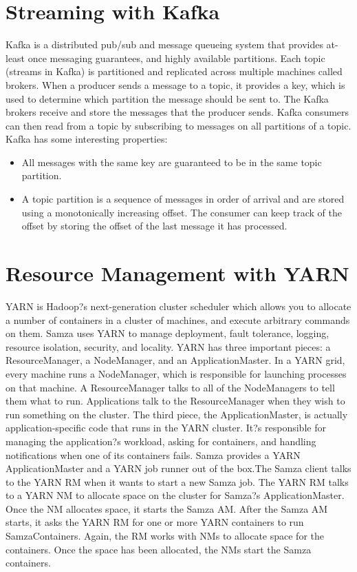 \documentclass[9pt,twocolumn,twoside]{styles/osajnl}
\begin{document}
\section{Streaming with Kafka}
Kafka is a distributed pub/sub and message queueing system that provides
at-least once messaging guarantees, and highly available partitions. Each topic
(streams in Kafka) is partitioned and replicated across multiple machines called
brokers. When a producer sends a message to a topic, it provides a key, which is
used to determine which partition the message should be sent to. The Kafka
brokers receive and store the messages that the producer sends. Kafka consumers
can then read from a topic by subscribing to messages on all partitions of a
topic.\cite{paper2}
Kafka has some interesting properties:

\begin{itemize}
\renewcommand{\labelitemi}{\scriptsize$\square$} 
\item All messages with the same key are guaranteed to be in the same topic partition.
\item A topic partition is a sequence of messages in order of arrival and are stored
using a monotonically increasing offset. The consumer can keep track of the
offset by storing the offset of the last message it has processed. 
\end{itemize}

\section{Resource Management with YARN}
YARN is Hadoop?s next-generation cluster scheduler which allows you to allocate
a number of containers in a cluster of machines, and execute arbitrary commands
on them. Samza uses YARN to manage deployment, fault tolerance, logging,
resource isolation, security, and locality. YARN has three important pieces: a
ResourceManager, a NodeManager, and an ApplicationMaster. In a YARN grid, every
machine runs a NodeManager, which is responsible for launching processes on that
machine. A ResourceManager talks to all of the NodeManagers to tell them what to
run. Applications talk to the ResourceManager when they wish to run something on
the cluster. The third piece, the ApplicationMaster, is actually
application-specific code that runs in the YARN cluster. It?s responsible for
managing the application?s workload, asking for containers, and handling
notifications when one of its containers fails.\cite{paper3}
Samza provides a YARN ApplicationMaster and a YARN job runner out of the box.The
Samza client talks to the YARN RM when it wants to start a new Samza job. The
YARN RM talks to a YARN NM to allocate space on the cluster for Samza?s
ApplicationMaster. Once the NM allocates space, it starts the Samza AM. After
the Samza AM starts, it asks the YARN RM for one or more YARN containers to run
SamzaContainers. Again, the RM works with NMs to allocate space for the
containers. Once the space has been allocated, the NMs start the Samza
containers.\cite{paper4}
\end{document}
